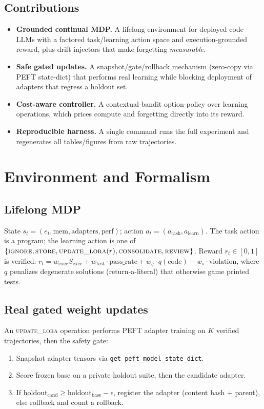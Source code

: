 \documentclass[10pt,conference]{IEEEtran}
\begin{document}
\subsection{Contributions}
\begin{itemize}
\item \textbf{Grounded continual MDP.} A lifelong environment for deployed code LLMs with a factored task/learning action space and execution-grounded reward, plus drift injectors that make forgetting \emph{measurable}.
\item \textbf{Safe gated updates.} A snapshot/gate/rollback mechanism (zero-copy via PEFT state-dict) that performs real learning while blocking deployment of adapters that regress a holdout set.
\item \textbf{Cost-aware controller.} A contextual-bandit option-policy over learning operations, which prices compute and forgetting directly into its reward.
\item \textbf{Reproducible harness.} A single command runs the full experiment and regenerates all tables/figures from raw trajectories.
\end{itemize}

\section{Environment and Formalism}
\subsection{Lifelong MDP}
State $s_t=(e_t, \text{mem}, \text{adapters}, \text{perf})$; action $a_t=(a_{\text{task}}, a_{\text{learn}})$. The task action is a program; the learning action is one of $\{\textsc{ignore}, \textsc{store}, \textsc{update\_lora}(r), \textsc{consolidate}, \textsc{review}\}$. Reward $r_t \in [0,1]$ is verified: $r_t = w_{\text{exec}} S_{\text{exec}} + w_{\text{test}}\cdot\text{pass\_rate} + w_q\cdot q(\text{code}) - w_s\cdot\text{violation}$, where $q$ penalizes degenerate solutions (return-a-literal) that otherwise game printed tests.

\subsection{Real gated weight updates}
An \textsc{update\_lora} operation performs PEFT adapter training on $K$ verified trajectories, then the safety gate:
\begin{enumerate}
\item Snapshot adapter tensors via \texttt{get\_peft\_model\_state\_dict}.
\item Score frozen base on a private holdout suite, then the candidate adapter.
\item If $\text{holdout}_{\text{cand}} \ge \text{holdout}_{\text{base}} - \epsilon$, register the adapter (content hash + parent), else rollback and count a rollback.
\end{enumerate}
\end{document}
